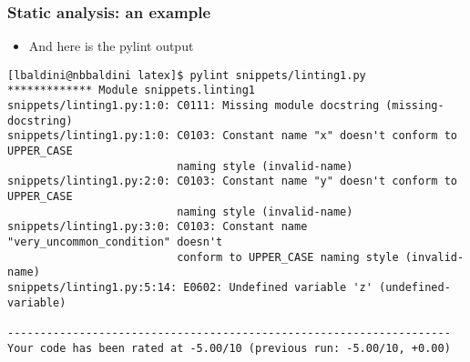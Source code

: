 \documentclass[9pt]{beamer}
\begin{document}
\begin{frame}[fragile]
  \frametitle{Static analysis: an example}
  

  \smallskip
  \begin{itemize}
  \item And here is the pylint output
  \end{itemize}
  \smallskip

  {\scriptsize
    \begin{Verbatim}
[lbaldini@nbbaldini latex]$ pylint snippets/linting1.py 
************* Module snippets.linting1
snippets/linting1.py:1:0: C0111: Missing module docstring (missing-docstring)
snippets/linting1.py:1:0: C0103: Constant name "x" doesn't conform to UPPER_CASE
                          naming style (invalid-name)
snippets/linting1.py:2:0: C0103: Constant name "y" doesn't conform to UPPER_CASE
                          naming style (invalid-name)
snippets/linting1.py:3:0: C0103: Constant name "very_uncommon_condition" doesn't
                          conform to UPPER_CASE naming style (invalid-name)
snippets/linting1.py:5:14: E0602: Undefined variable 'z' (undefined-variable)

--------------------------------------------------------------------
Your code has been rated at -5.00/10 (previous run: -5.00/10, +0.00)
    \end{Verbatim}
  }
\end{frame}
\end{document}
